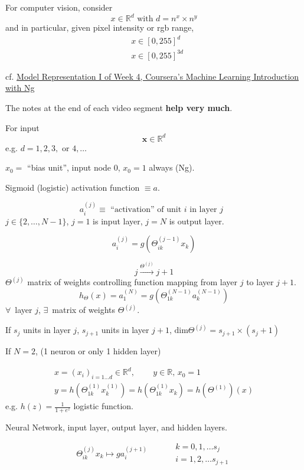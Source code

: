 \documentclass[10pt]{amsart}
\begin{document}
\begin{multicols*}{2}
For computer vision, consider
\[
x\in \mathbb{R}^d \text{ with } d = n^x \times n^y 
\]
and in particular, given pixel intensity or rgb range,
\[
\begin{aligned}
  & x\in [0,255]^d \\ 
  & x\in [0,255]^{3d}
\end{aligned}
\]

 



cf. \href{https://www.coursera.org/learn/machine-learning/supplement/Bln5m/model-representation-i}{Model Representation I of Week 4, Coursera's Machine Learning Introduction with Ng}

The notes at the end of each video segment \textbf{help very much}.

For input
\[
\mathbf{x} \in \mathbb{R}^d
\]
e.g. $d=1,2,3,\text{ or } 4, \dots $

$x_0  = $ ``bias unit'', input node 0, $x_0 =1$ always (Ng).


Sigmoid (logistic) activation function $\equiv a$.

\[
a_i^{(j)} \equiv \text{ ``activation'' of unit $i$ in layer $j$ }
\]
$j \in \lbrace 2, \dots , N-1 \rbrace$, $j=1$ is input layer, $j=N$ is output layer.

\[
a_i^{(j)} = g(\Theta_{ik}^{(j-1)} x_k)
\]

\[
j\xrightarrow{ \Theta^{(j)} } j+1 
\]
$\Theta^{(j)}$ matrix of weights controlling function mapping from layer $j$ to layer $j+1$.
\[
h_{\Theta}(x) = a_1^{(N)} = g(\Theta_{1k}^{(N-1)} a_k^{(N-1)} )
\]
$\forall \, $ layer $j$, $\exists \, $ matrix of weights $\Theta^{(j)}$.

If $s_j$ units in layer $j$, $s_{j+1}$ units in layer $j+1$, $\text{dim}\Theta^{(j)} = s_{j+1} \times (s_j + 1)$


If $N=2$, (1 neuron or only 1 hidden layer)

\[
\begin{gathered}
  x = (x_i)_{i=1 \dots d} \in \mathbb{R}^d, \qquad \, y \in \mathbb{R} , \, x_0 =1 \\ 
 y = h(\Theta_{1k}^{(1)} x_k^{(1)} ) = h(\Theta_{1k}^{(1)}x_k) = h(\Theta^{(1)} )(x)
  \end{gathered}
\]
e.g. $h(z) = \frac{1}{ 1 + e^z} $ logistic function.

Neural Network, input layer, output layer, and hidden layers.

\begin{equation}
  \Theta_{ik}^{(j)}x_k \mapsto g a_i^{(j+1)}   \qquad \, \begin{aligned} & k = 0,1, \dots s_j \\
    & i = 1,2, \dots s_{j+1} \end{aligned}
  \end{equation}


\end{multicols*}
\end{document}
